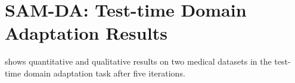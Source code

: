 \section{SAM-DA: Test-time Domain Adaptation Results}

 shows quantitative and qualitative results on two medical datasets in the test-time domain adaptation task after five iterations.

